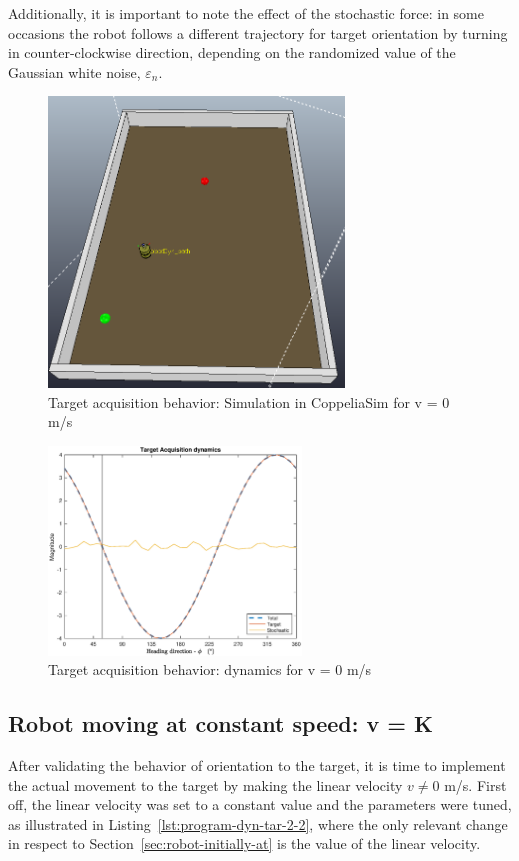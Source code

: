 Additionally, it is important to note the effect of the stochastic force: in
some occasions the robot follows a different trajectory for target orientation
by turning in counter-clockwise direction, depending on the randomized value of
the Gaussian white noise, $\varepsilon_n$.
%
\begin{figure}[!hbt]
\centering
    \includegraphics[width=0.7\textwidth]{./img/tar-2-1-arena.png}
  \caption{Target acquisition behavior: Simulation in CoppeliaSim for v = 0 m/s}%
\label{fig:tar-2-1-arena}
\end{figure}
%
\begin{figure}[!hbt]
\centering
    \includegraphics[width=0.6\textwidth]{./img/tar-2-1.eps}
  \caption{Target acquisition behavior: dynamics for v = 0 m/s}%
\label{fig:tar-2-1}
\end{figure}
%
\subsection{Robot moving at constant speed: v = K}%
\label{sec:robot-constant-speed}
After validating the behavior of orientation to the target, it is time to
implement the actual movement to the target by making the linear velocity $v
\neq 0$ m/s. First off, the linear velocity was set to a constant value and the
parameters were tuned, as illustrated in Listing~\ref{lst:program-dyn-tar-2-2},
where the only relevant change in respect to
Section~\ref{sec:robot-initially-at} is the value of the linear velocity.

